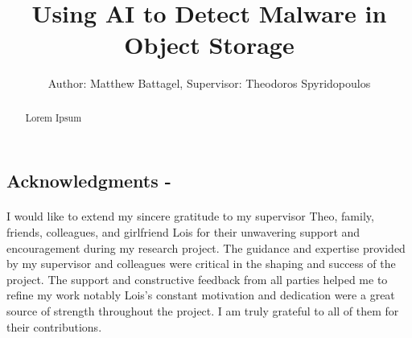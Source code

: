 \documentclass[12pt, conference, final, a4paper, onecolumn, compsoc]{IEEEtran}
\begin{document}
\title{Using AI to Detect Malware in Object Storage} \author{Author: Matthew
  Battagel, Supervisor: Theodoros Spyridopoulos} 
\maketitle{}

\subsection*{Acknowledgments - }
\paragraph{}
I would like to extend my sincere gratitude to my supervisor Theo, family,
friends, colleagues, and girlfriend Lois for their unwavering support and
encouragement during my research project. The guidance and expertise provided by
my supervisor and colleagues were critical in the shaping and success of the
project. The support and constructive feedback from all parties helped me to
refine my work notably Lois's constant motivation and dedication were a great
source of strength throughout the project. I am truly grateful to all of them
for their contributions.

\bigskip

\begin{abstract}
    Lorem Ipsum
\end{abstract}

\pagebreak




\end{document}
